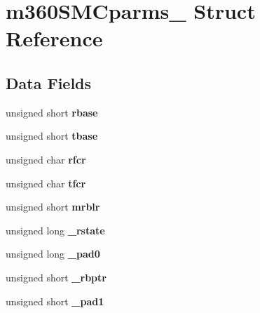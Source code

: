 \hypertarget{structm360SMCparms__}{}\section{m360\+S\+M\+Cparms\+\_\+ Struct Reference}
\label{structm360SMCparms__}
\subsection*{Data Fields}
\begin{DoxyCompactItemize}
\item 
\mbox{\label{structm360SMCparms___a21412f6cf05f6086c2d3d1a2b53efce3}} 
unsigned short {\bfseries rbase}
\item 
\mbox{\label{structm360SMCparms___a93c510436ae61b2dfaa596a6045b0a32}} 
unsigned short {\bfseries tbase}
\item 
\mbox{\label{structm360SMCparms___aaba1cafccad651dbf74692241f708b66}} 
unsigned char {\bfseries rfcr}
\item 
\mbox{\label{structm360SMCparms___a6db6b7983d244b09bb7f95e705de679b}} 
unsigned char {\bfseries tfcr}
\item 
\mbox{\label{structm360SMCparms___a10b567141e9a2410a316d4bba6c975e8}} 
unsigned short {\bfseries mrblr}
\item 
\mbox{\label{structm360SMCparms___ad463bd3b4812ffa88b6009f94df728b1}} 
unsigned long {\bfseries \+\_\+rstate}
\item 
\mbox{\label{structm360SMCparms___a08883f22ec77c37868c968f74d6fe87d}} 
unsigned long {\bfseries \+\_\+pad0}
\item 
\mbox{\label{structm360SMCparms___a7e343a72e9143b9f0bc3974a15f9c769}} 
unsigned short {\bfseries \+\_\+rbptr}
\item 
\mbox{\label{structm360SMCparms___a3167caebae8d1ed4f12efe55b761f029}} 
unsigned short {\bfseries \+\_\+pad1}
\item 

\end{DoxyCompactItemize}
